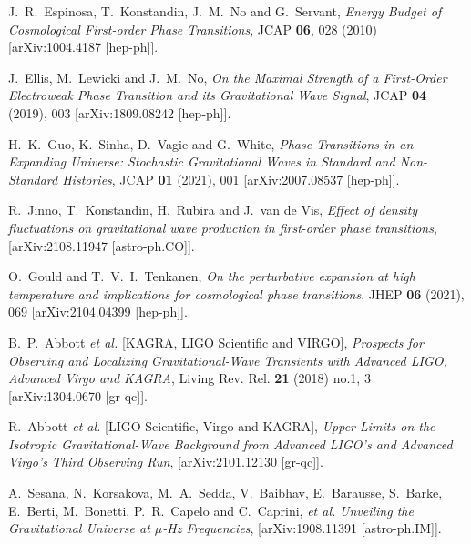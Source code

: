 \documentclass[a4paper,11pt]{article}
\begin{document}
\begin{thebibliography}{99}
J.~R.~Espinosa, T.~Konstandin, J.~M.~No and G.~Servant,
{\em Energy Budget of Cosmological First-order Phase Transitions},
JCAP \textbf{06}, 028 (2010)
[arXiv:1004.4187 [hep-ph]].

J.~Ellis, M.~Lewicki and J.~M.~No,
{\em On the Maximal Strength of a First-Order Electroweak Phase Transition and its Gravitational Wave Signal},
JCAP \textbf{04} (2019), 003
[arXiv:1809.08242 [hep-ph]].

H.~K.~Guo, K.~Sinha, D.~Vagie and G.~White,
{\em Phase Transitions in an Expanding Universe: Stochastic Gravitational Waves in Standard and Non-Standard Histories},
JCAP \textbf{01} (2021), 001
[arXiv:2007.08537 [hep-ph]].

R.~Jinno, T.~Konstandin, H.~Rubira and J.~van de Vis,
{\em Effect of density fluctuations on gravitational wave production in first-order phase transitions},
[arXiv:2108.11947 [astro-ph.CO]].

O.~Gould and T.~V.~I.~Tenkanen,
{\em On the perturbative expansion at high temperature and implications for cosmological phase transitions},
JHEP \textbf{06} (2021), 069
[arXiv:2104.04399 [hep-ph]].

B.~P.~Abbott \textit{et al.} [KAGRA, LIGO Scientific and VIRGO],
{\em Prospects for Observing and Localizing Gravitational-Wave Transients with Advanced LIGO, Advanced Virgo and KAGRA},
Living Rev. Rel. \textbf{21} (2018) no.1, 3
[arXiv:1304.0670 [gr-qc]].

R.~Abbott \textit{et al.} [LIGO Scientific, Virgo and KAGRA],
{\em Upper Limits on the Isotropic Gravitational-Wave Background from Advanced LIGO's and Advanced Virgo's Third Observing Run},
[arXiv:2101.12130 [gr-qc]].

A.~Sesana, N.~Korsakova, M.~A.~Sedda, V.~Baibhav, E.~Barausse, S.~Barke, E.~Berti, M.~Bonetti, P.~R.~Capelo and C.~Caprini, \textit{et al.}
{\em Unveiling the Gravitational Universe at $\mu$-Hz Frequencies},
[arXiv:1908.11391 [astro-ph.IM]].


\end{thebibliography}
\end{document}
